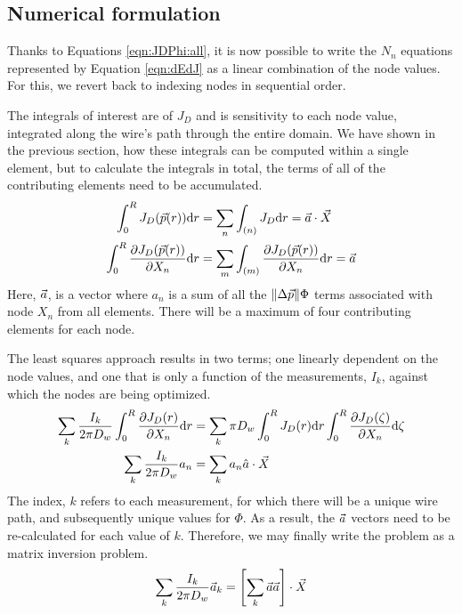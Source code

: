 \subsection{Numerical formulation}\label{sec:numerical}

Thanks to Equations \ref{eqn:JDPhi:all}, it is now possible to write the $N_n$ equations represented by Equation \ref{eqn:dEdJ} as a linear combination of the node values.  For this, we revert back to indexing nodes in sequential order.

The integrals of interest are of $J_D$ and is sensitivity to each node value, integrated along the wire's path through the entire domain.  We have shown in the previous section, how these integrals can be computed within a single element, but to calculate the integrals in total, the terms of all of the contributing elements need to be accumulated.
\begin{align}
\int_0^R J_D(\vec{p}(r)) \mathrm{d}r &= \sum_n \int_{(n)}J_D \mathrm{d}r = \vec{a} \cdot \vec{X}\\
\int_0^R \frac{\partial J_D(\vec{p}(r))}{\partial X_n} \mathrm{d}r &= \sum_m \int_{(m)} \frac{\partial J_D(\vec{p}(r))}{\partial X_n} \mathrm{d}r = \vec{a}
\end{align}
Here, $\vec{a}$, is a vector where $a_n$ is a sum of all the $\|\Delta \vec{p}\| \Phi$ terms associated with node $X_n$ from all elements.  There will be a maximum of four contributing elements for each node.

The least squares approach results in two terms; one linearly dependent on the node values, and one that is only a function of the measurements, $I_k$, against which the nodes are being optimized.  
\begin{align}
\sum_k \frac{I_k}{2\pi D_w} \int_0^R \frac{\partial J_D(r)}{\partial X_n} \mathrm{d}r &= \sum_k \pi D_w \int_0^R J_D(r) \mathrm{d}r \int_0^R \frac{\partial J_D(\zeta)}{\partial X_n} \mathrm{d}\zeta \nonumber\\
\sum_k \frac{I_k}{2\pi D_w} a_n & = \sum_k a_n \hat{a} \cdot \vec{X}
\end{align}
The index, $k$ refers to each measurement, for which there will be a unique wire path, and subsequently unique values for $\Phi$.  As a result, the $\vec{a}$ vectors need to be re-calculated for each value of $k$.  Therefore, we may finally write the problem as a matrix inversion problem.
\begin{align}
\sum_k \frac{I_k}{2\pi D_w} \vec{a}_k = \left[\sum_k \vec{a}\vec{a} \right] \cdot \vec{X}
\end{align}


